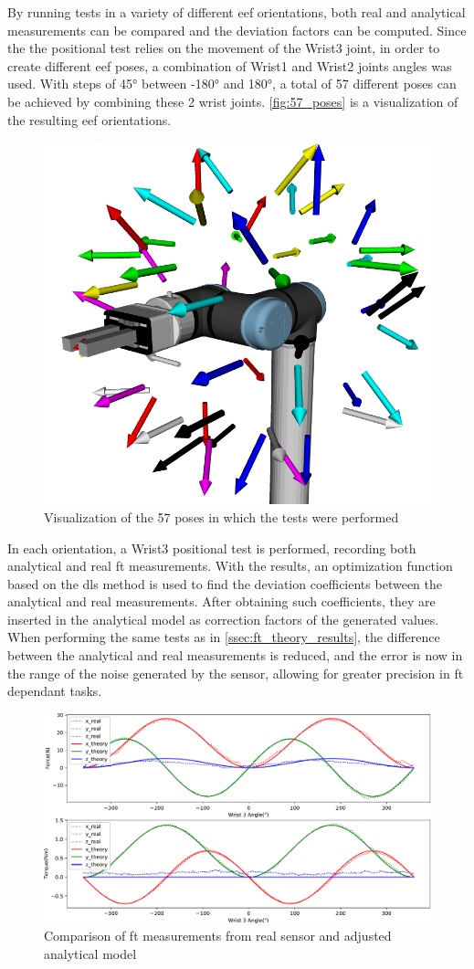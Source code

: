 
\par By running tests in a variety of different \ac{eef} orientations, both real and analytical measurements can be compared and the deviation factors can be computed. Since the the positional test relies on the movement of the Wrist3 joint, in order to create different \ac{eef} poses, a combination of Wrist1 and Wrist2 joints angles was used. With steps of \ang{45} between \ang{-180} and \ang{180}, a total of 57 different poses can be achieved by combining these 2 wrist joints. \autoref{fig:57_poses} is a visualization of the resulting \ac{eef} orientations.

\begin{figure}[h]
    \centering
    \includegraphics[width=0.35\linewidth]{figs/chp3/globe_57.png}
    \caption{Visualization of the 57 poses in which the tests were performed}
    \label{fig:57_poses}
\end{figure}

\par In each orientation, a Wrist3 positional test is performed, recording both analytical and real \ac{ft} measurements. With the results, an optimization function based on the \ac{dls} method is used to find the deviation coefficients between the analytical and real measurements. After obtaining such coefficients, they are inserted in the analytical model as correction factors of the generated values. When performing the same tests as in \autoref{ssec:ft_theory_results}, the difference between the analytical and real measurements is reduced, and the error is now in the range of the noise generated by the sensor, allowing for greater precision in \ac{ft} dependant tasks.

\begin{figure}[h]
    \centering
    \includegraphics[width=0.8\linewidth]{figs/chp3/ft_sensor_theory_adjust.pdf}
    \caption{Comparison of \ac{ft} measurements from real sensor and adjusted analytical model}
    \label{fig:ft_sensor_theory_adjust}
\end{figure}

